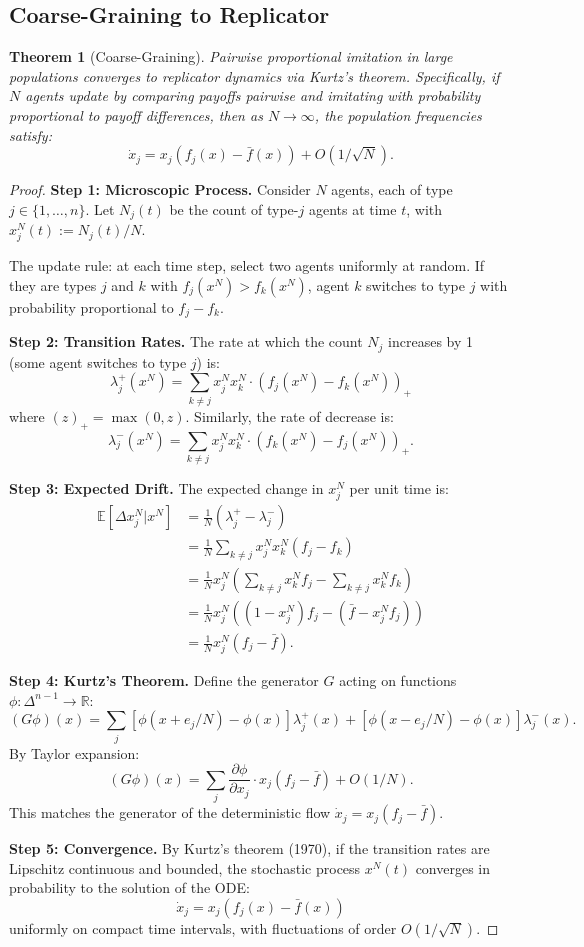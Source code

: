 \documentclass[12pt]{article}
\newtheorem{theorem}{Theorem}[section]
\newcommand{\R}{\mathbb{R}}
\newcommand{\E}{\mathbb{E}}
\begin{document}
\subsection{Coarse-Graining to Replicator}

\begin{theorem}[Coarse-Graining]
\label{thm:coarse-grain}
Pairwise proportional imitation in large populations converges to replicator dynamics via Kurtz's theorem. Specifically, if $N$ agents update by comparing payoffs pairwise and imitating with probability proportional to payoff differences, then as $N \to \infty$, the population frequencies satisfy:
\[
\dot{x}_j = x_j(f_j(x) - \bar{f}(x)) + O(1/\sqrt{N}).
\]
\end{theorem}

\begin{proof}
\textbf{Step 1: Microscopic Process.}
Consider $N$ agents, each of type $j \in \{1, \ldots, n\}$. Let $N_j(t)$ be the count of type-$j$ agents at time $t$, with $x_j^N(t) := N_j(t)/N$.

The update rule: at each time step, select two agents uniformly at random. If they are types $j$ and $k$ with $f_j(x^N) > f_k(x^N)$, agent $k$ switches to type $j$ with probability proportional to $f_j - f_k$.

\textbf{Step 2: Transition Rates.}
The rate at which the count $N_j$ increases by 1 (some agent switches to type $j$) is:
\[
\lambda_j^+(x^N) = \sum_{k \neq j} x_j^N x_k^N \cdot (f_j(x^N) - f_k(x^N))_+
\]
where $(z)_+ = \max(0, z)$. Similarly, the rate of decrease is:
\[
\lambda_j^-(x^N) = \sum_{k \neq j} x_j^N x_k^N \cdot (f_k(x^N) - f_j(x^N))_+.
\]

\textbf{Step 3: Expected Drift.}
The expected change in $x_j^N$ per unit time is:
\begin{align*}
\E[\Delta x_j^N | x^N] &= \frac{1}{N}(\lambda_j^+ - \lambda_j^-) \\
&= \frac{1}{N} \sum_{k \neq j} x_j^N x_k^N (f_j - f_k) \\
&= \frac{1}{N} x_j^N \left( \sum_{k \neq j} x_k^N f_j - \sum_{k \neq j} x_k^N f_k \right) \\
&= \frac{1}{N} x_j^N \left( (1 - x_j^N) f_j - (\bar{f} - x_j^N f_j) \right) \\
&= \frac{1}{N} x_j^N (f_j - \bar{f}).
\end{align*}

\textbf{Step 4: Kurtz's Theorem.}
Define the generator $G$ acting on functions $\phi: \Delta^{n-1} \to \R$:
\[
(G\phi)(x) = \sum_j \left[ \phi(x + e_j/N) - \phi(x) \right] \lambda_j^+(x) + \left[ \phi(x - e_j/N) - \phi(x) \right] \lambda_j^-(x).
\]
By Taylor expansion:
\[
(G\phi)(x) = \sum_j \frac{\partial \phi}{\partial x_j} \cdot x_j(f_j - \bar{f}) + O(1/N).
\]
This matches the generator of the deterministic flow $\dot{x}_j = x_j(f_j - \bar{f})$.

\textbf{Step 5: Convergence.}
By Kurtz's theorem (1970), if the transition rates are Lipschitz continuous and bounded, the stochastic process $x^N(t)$ converges in probability to the solution of the ODE:
\[
\dot{x}_j = x_j(f_j(x) - \bar{f}(x))
\]
uniformly on compact time intervals, with fluctuations of order $O(1/\sqrt{N})$.
\end{proof}
\end{document}
